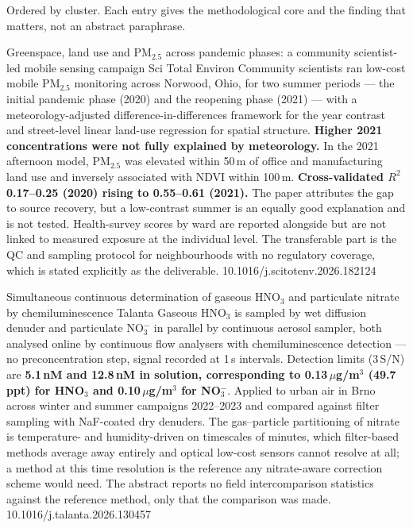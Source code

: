 \documentclass[10pt]{article}
\begin{document}
{\fontsize{7.4}{9}\selectfont\color{Slate}Ordered by cluster. Each entry gives the
methodological core and the finding that matters, not an abstract paraphrase.\par}


{Greenspace, land use and PM$_{2.5}$ across pandemic phases: a community scientist-led mobile sensing campaign}
{Sci Total Environ}
{Community scientists ran low-cost mobile PM$_{2.5}$ monitoring across Norwood, Ohio, for
two summer periods --- the initial pandemic phase (2020) and the reopening phase (2021) ---
with a meteorology-adjusted difference-in-differences framework for the year contrast and
street-level linear land-use regression for spatial structure. \textbf{Higher 2021
concentrations were not fully explained by meteorology.} In the 2021 afternoon model,
PM$_{2.5}$ was elevated within 50\,m of office and manufacturing land use and inversely
associated with NDVI within 100\,m. \textbf{Cross-validated $R^2$ 0.17--0.25 (2020) rising
to 0.55--0.61 (2021).} The paper attributes the gap to source recovery, but a
low-contrast summer is an equally good explanation and is not tested. Health-survey scores
by ward are reported alongside but are not linked to measured exposure at the individual
level. The transferable part is the QC and sampling protocol for neighbourhoods with no
regulatory coverage, which is stated explicitly as the deliverable.}
{10.1016/j.scitotenv.2026.182124}

{Simultaneous continuous determination of gaseous HNO$_3$ and particulate nitrate by chemiluminescence}
{Talanta}
{Gaseous HNO$_3$ is sampled by wet diffusion denuder and particulate NO$_3^-$ in parallel
by continuous aerosol sampler, both analysed online by continuous flow analysers with
chemiluminescence detection --- no preconcentration step, signal recorded at 1\,s
intervals. Detection limits (3\,S/N) are \textbf{5.1\,nM and 12.8\,nM in solution,
corresponding to 0.13\,$\mu$g/m$^3$ (49.7\,ppt) for HNO$_3$ and 0.10\,$\mu$g/m$^3$ for
NO$_3^-$}. Applied to urban air in Brno across winter and summer campaigns 2022--2023 and
compared against filter sampling with NaF-coated dry denuders. The gas--particle
partitioning of nitrate is temperature- and humidity-driven on timescales of minutes, which
filter-based methods average away entirely and optical low-cost sensors cannot resolve at
all; a method at this time resolution is the reference any nitrate-aware correction scheme
would need. The abstract reports no field intercomparison statistics against the reference
method, only that the comparison was made.}
{10.1016/j.talanta.2026.130457}
\end{document}

